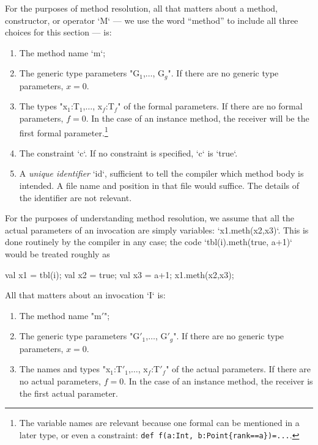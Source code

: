 For the purposes of method resolution, all that matters about a method,
constructor, or operator \xcd`M` --- we use the word ``method'' to include all
three choices for this section --- is: 
\begin{enumerate}
\item The method name \xcd`m`;
\item The generic type parameters \xcdmath"G$_1$,$\ldots$, G$_g$".  If there
      are no generic type parameters, {$x=0$}.  
\item The types \xcdmath"x$_1$:T$_1$,$\ldots$, x$_f$:T$_f$" of the formal parameters.  If
      there are no formal parameters, {$f=0$}. In the case of an instance
      method, the receiver will be the first formal parameter.\footnote{The
      variable names are relevant because one formal can be mentioned in a
      later type, or even a constraint: {\tt def f(a:Int, b:Point\{rank==a\})=...}.}
\item The constraint \xcd`c`. If no constraint is specified, \xcd`c` is
      \xcd`true`. 
\item A {\em unique identifier} \xcd`id`, sufficient to tell the compiler
      which method body is intended.  A file name and position in that file
      would suffice.  The details of the identifier are not relevant.
\end{enumerate}

For the purposes of understanding method resolution, we assume that all the
actual parameters of an invocation are simply variables: \xcd`x1.meth(x2,x3)`.
This is done routinely by the compiler in any case; the code 
\xcd`tbl(i).meth(true, a+1)` would be treated roughly as 
\begin{xten}
val x1 = tbl(i);
val x2 = true;
val x3 = a+1;
x1.meth(x2,x3);
\end{xten}

All that matters about an invocation \xcd`I` is: 
\begin{enumerate}
\item The method name \xcdmath"m$'$";
\item The generic type parameters \xcdmath"G$'_1$,$\ldots$, G$'_g$".  If there
      are no generic type parameters, {$x=0$}.  
\item The names and types \xcdmath"x$_1$:T$'_1$,$\ldots$, x$_f$:T$'_f$" of the actual parameters.  If
      there are no actual parameters, {$f=0$}. In the case of an instance
      method, the receiver is the first actual parameter.
\end{enumerate}

